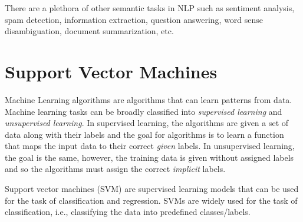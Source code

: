 There are a plethora of other semantic tasks in NLP such as sentiment analysis, spam detection, information extraction, question answering, word sense disambiguation, document summarization, etc.

\section{Support Vector Machines}\label{sec:SVM}

Machine Learning algorithms are algorithms that can learn patterns from data. Machine learning tasks can be broadly classified into \textit{supervised learning} and \textit{unsupervised learning}. In supervised learning, the algorithms are given a set of data along with their labels and the goal for algorithms is to learn a function that maps the input data to their correct \textit{given} labels. In unsupervised learning, the goal is the same, however, the training data is given without assigned labels and so the algorithms must assign the correct \emph{implicit} labels.

Support vector machines (SVM) are supervised learning models that can be used for the task of classification and regression. SVMs are widely used for the task of classification, i.e., classifying the data into predefined classes/labels.

